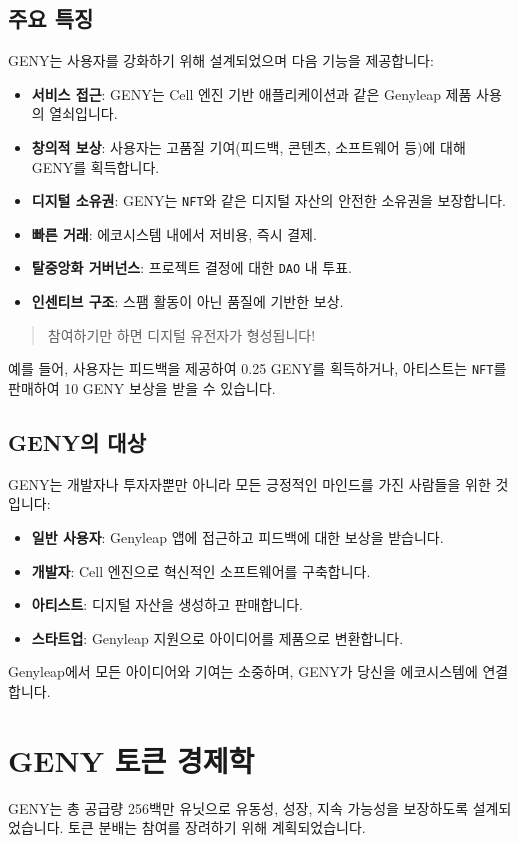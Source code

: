 \documentclass[a4paper,12pt,openany]{book}
\begin{document}
\subsection*{주요 특징}
GENY는 사용자를 강화하기 위해 설계되었으며 다음 기능을 제공합니다:
\begin{itemize}
    \item \textbf{서비스 접근}: GENY는 Cell 엔진 기반 애플리케이션과 같은 Genyleap 제품 사용의 열쇠입니다.
    \item \textbf{창의적 보상}: 사용자는 고품질 기여(피드백, 콘텐츠, 소프트웨어 등)에 대해 GENY를 획득합니다.
    \item \textbf{디지털 소유권}: GENY는 \texttt{NFT}와 같은 디지털 자산의 안전한 소유권을 보장합니다.
    \item \textbf{빠른 거래}: 에코시스템 내에서 저비용, 즉시 결제.
    \item \textbf{탈중앙화 거버넌스}: 프로젝트 결정에 대한 \texttt{DAO} 내 투표.
    \item \textbf{인센티브 구조}: 스팸 활동이 아닌 품질에 기반한 보상.
\end{itemize}
\begin{quote}
참여하기만 하면 디지털 유전자가 형성됩니다!
\end{quote}
예를 들어, 사용자는 피드백을 제공하여 0.25 GENY를 획득하거나, 아티스트는 \texttt{NFT}를 판매하여 10 GENY 보상을 받을 수 있습니다.

\subsection*{GENY의 대상}
GENY는 개발자나 투자자뿐만 아니라 모든 긍정적인 마인드를 가진 사람들을 위한 것입니다:
\begin{itemize}
    \item \textbf{일반 사용자}: Genyleap 앱에 접근하고 피드백에 대한 보상을 받습니다.
    \item \textbf{개발자}: Cell 엔진으로 혁신적인 소프트웨어를 구축합니다.
    \item \textbf{아티스트}: 디지털 자산을 생성하고 판매합니다.
    \item \textbf{스타트업}: Genyleap 지원으로 아이디어를 제품으로 변환합니다.
\end{itemize}
Genyleap에서 모든 아이디어와 기여는 소중하며, GENY가 당신을 에코시스템에 연결합니다.
\newpage

\section*{GENY 토큰 경제학}
GENY는 총 공급량 256백만 유닛으로 유동성, 성장, 지속 가능성을 보장하도록 설계되었습니다. 토큰 분배는 참여를 장려하기 위해 계획되었습니다.
\end{document}
